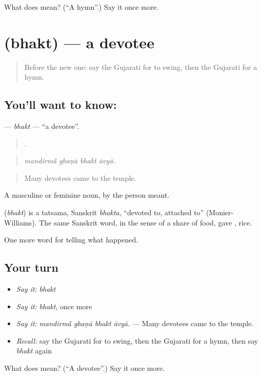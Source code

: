 \begin{tcolorbox}[breakable,colback=teal!4,colframe=teal!35!black,title={Before you move on}]
What does  mean? (\textquotedblleft{}A hymn\textquotedblright{}.) Say it once more.
\end{tcolorbox}
\section[\texorpdfstring{\gu{ભક્ત} (bhakt)}{ભક્ત (bhakt)}]{ (bhakt) — a devotee}

\label{lesson:GU-C330-bhakt}



\begin{quote}
Before the new one: say the Gujarati for to swing, then the Gujarati for a hymn.
\end{quote}

\subsection*{You'll want to know: }
\textbf{} — \emph{bhakt} — \textquotedblleft{}a devotee\textquotedblright{}.

\begin{quote}
   .
\end{quote}

\begin{quote}
\emph{mandirmā̃ ghaṇā bhakt āvyā.}
\end{quote}

\begin{quote}
Many devotees came to the temple.
\end{quote}

A masculine or feminine noun, by the person meant.

\begin{cousinweb}
\textbf{} (\emph{bhakt}) is a tatsama, Sanskrit \emph{bhakta}, \textquotedblleft{}devoted to, attached to\textquotedblright{} (Monier-Williams). The same Sanskrit word, in the sense of a share of food, gave \textbf{}, rice.
\end{cousinweb}

\begin{grammarlens}[title={What you've built}]
One more word for telling what happened.
\end{grammarlens}

\subsection*{Your turn}
\begin{itemize}
\raggedright
  \item \emph{Say it:} \emph{bhakt}
  \item \emph{Say it:} \emph{bhakt}, once more
  \item \emph{Say it:} \emph{mandirmā̃ ghaṇā bhakt āvyā.} — Many devotees came to the temple.
  \item \emph{Recall:} say the Gujarati for to swing, then the Gujarati for a hymn, then say \emph{bhakt} again
\end{itemize}

\begin{tcolorbox}[breakable,colback=teal!4,colframe=teal!35!black,title={Before you move on}]
What does  mean? (\textquotedblleft{}A devotee\textquotedblright{}.) Say it once more.
\end{tcolorbox}
